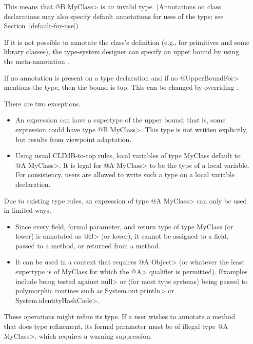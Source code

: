 This means that \<@B MyClass> is an invalid type.  (Annotations on class declarations may also specify
default annotations for uses of the type; see Section~\ref{default-for-use})

If it is not possible to annotate the class's definition (e.g., for
primitives and some library classes),
the type-system designer can specify an upper bound by using the meta-annotation
.

If no annotation is present on a type declaration and if no \<@UpperBoundFor> mentions the type, then
the bound is top. This can be changed by overriding
.

There are two exceptions.
\begin{itemize}
  \item
  An expression can have a supertype of the upper bound; that is, some expression could
  have type \<@B MyClass>.  This type is not written explicitly, but results from viewpoint adaptation.
  \item
  Using usual CLIMB-to-top rules, local variables of type MyClass default to \<@A MyClass>.
  It is legal for \<@A MyClass> to be the type of a local variable.
  For consistency, users are allowed to write such a type on a local variable declaration.
\end{itemize}

Due to existing type rules, an expression of type \<@A MyClass> can only be used in limited ways.
\begin{itemize}
  \item
  Since every field, formal parameter, and return type of type MyClass (or lower) is annotated as
  \<@B> (or lower), it cannot be assigned to a field, passed to a method, or returned from a method.
  \item
  It can be used in a context that requires \<@A Object> (or whatever the least supertype is of MyClass
  for which the \<@A> qualifier is permitted).  Examples include being tested against \<null> or
  (for most type systems) being passed to polymorphic routines such as \<System.out.println> or \<System.identityHashCode>.
\end{itemize}

These operations might refine its type.  If a user wishes to annotate a method that does type refinement,
its formal parameter must be of illegal type \<@A MyClass>, which requires a warning suppression.

